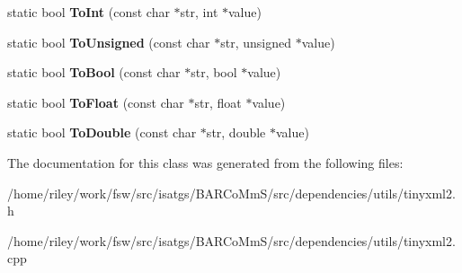 \begin{DoxyCompactItemize}
\item 
static bool {\bfseries To\+Int} (const char $\ast$str, int $\ast$value)\hypertarget{classtinyxml2_1_1_x_m_l_util_ad4df4023d11ee3fca9689c49b9707323}{}\label{classtinyxml2_1_1_x_m_l_util_ad4df4023d11ee3fca9689c49b9707323}

\item 
static bool {\bfseries To\+Unsigned} (const char $\ast$str, unsigned $\ast$value)\hypertarget{classtinyxml2_1_1_x_m_l_util_a210c8637d5eb4ce3d4625294af0efc2f}{}\label{classtinyxml2_1_1_x_m_l_util_a210c8637d5eb4ce3d4625294af0efc2f}

\item 
static bool {\bfseries To\+Bool} (const char $\ast$str, bool $\ast$value)\hypertarget{classtinyxml2_1_1_x_m_l_util_ae5b03e0a1ca5d42052a7ac540f7aa12a}{}\label{classtinyxml2_1_1_x_m_l_util_ae5b03e0a1ca5d42052a7ac540f7aa12a}

\item 
static bool {\bfseries To\+Float} (const char $\ast$str, float $\ast$value)\hypertarget{classtinyxml2_1_1_x_m_l_util_a399e71edb5f29d61ea81d91ee0332bb9}{}\label{classtinyxml2_1_1_x_m_l_util_a399e71edb5f29d61ea81d91ee0332bb9}

\item 
static bool {\bfseries To\+Double} (const char $\ast$str, double $\ast$value)\hypertarget{classtinyxml2_1_1_x_m_l_util_ad8f75ac140fb19c1c6e164a957c4cd53}{}\label{classtinyxml2_1_1_x_m_l_util_ad8f75ac140fb19c1c6e164a957c4cd53}

\end{DoxyCompactItemize}


The documentation for this class was generated from the following files\+:\begin{DoxyCompactItemize}
\item 
/home/riley/work/fsw/src/isatgs/\+B\+A\+R\+Co\+Mm\+S/src/dependencies/utils/tinyxml2.\+h\item 
/home/riley/work/fsw/src/isatgs/\+B\+A\+R\+Co\+Mm\+S/src/dependencies/utils/tinyxml2.\+cpp\end{DoxyCompactItemize}
